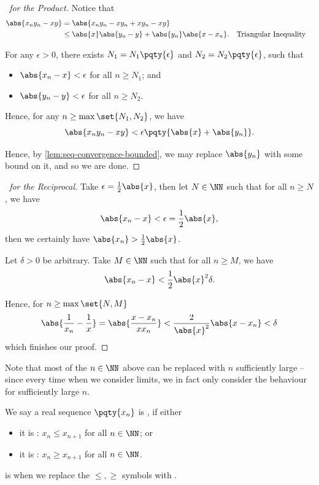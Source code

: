 \begin{proof}[\proofname\ for the Product]
    Notice that
    \begin{align*}
        \abs{x_n y_n - xy} &= \abs{x_n y_n - x y_n + x y_n - xy} \\
        &\leq \abs{x} \abs{y_n - y} + \abs{y_n} \abs{x - x_n}. && \text{Triangular Inequality}
    \end{align*}

    For any \(\epsilon > 0\), there exists \(N_1 = N_1 \pqty{\epsilon}\) and \(N_2 = N_2 \pqty{\epsilon}\), such that
    \begin{itemize}
        \item \(\abs{x_n - x} < \epsilon\) for all \(n \geq N_1\); and
        \item \(\abs{y_n - y} < \epsilon\) for all \(n \geq N_2\).
    \end{itemize}

    Hence, for any \(n \geq \max\set{N_1, N_2}\), we have
    \[
        \abs{x_n y_n - xy} < \epsilon \pqty{\abs{x} + \abs{y_n}}.
    \]

    Hence, by \autoref{lem:seq-convergence-bounded}, we may replace \(\abs{y_n}\) with some bound on it, and so we are done.
\end{proof}

\begin{proof}[\proofname\ for the Reciprocal]
    Take \(\epsilon = \frac{1}{2} \abs{x}\), then let \(N \in \NN\) such that for all \(n \geq N\), we have
    \[
        \abs{x_n - x} < \epsilon = \frac{1}{2} \abs{x},
    \]
    then we certainly have \(\abs{x_n} > \frac{1}{2} \abs{x}\).

    Let \(\delta > 0\) be arbitrary. Take \(M \in \NN\) such that for all \(n \geq M\), we have
    \[
        \abs{x_n - x} < \frac{1}{2} \abs{x}^2 \delta.
    \]

    Hence, for \(n \geq \max\set{N, M}\)
    \begin{align*}
        \abs{\frac{1}{x_n} - \frac{1}{x}} = \abs{\frac{x - x_n}{x x_n}} < \frac{2}{\abs{x}^2} \abs{x - x_n} < \delta
    \end{align*}
    which finishes our proof.
\end{proof}

Note that most of the \(n \in \NN\) above can be replaced with \(n\) sufficiently large -- since every time when we consider limits, we in fact only consider the behaviour for sufficiently large \(n\).

\begin{definition}
    \label{def:seq-monotone}%
    We say a real sequence \(\pqty{x_n}\) is , if either
    \begin{itemize}
        \item it is : \(x_n \leq x_{n + 1}\) for all \(n \in \NN\); or
        \item it is : \(x_n \geq x_{n + 1}\) for all \(n \in \NN\).
    \end{itemize}

     is when we replace the \(\leq, \geq\) symbols with \(<, >\).
\end{definition}

